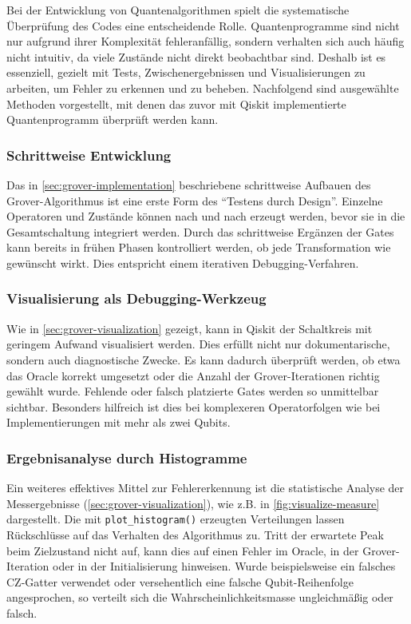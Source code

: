 Bei der Entwicklung von Quantenalgorithmen spielt die systematische Überprüfung des Codes eine entscheidende Rolle. Quantenprogramme sind nicht nur aufgrund ihrer Komplexität fehleranfällig, sondern verhalten sich auch häufig nicht intuitiv, da viele Zustände nicht direkt beobachtbar sind. Deshalb ist es essenziell, gezielt mit Tests, Zwischenergebnissen und Visualisierungen zu arbeiten, um Fehler zu erkennen und zu beheben. Nachfolgend sind ausgewählte Methoden vorgestellt, mit denen das zuvor mit Qiskit implementierte Quantenprogramm überprüft werden kann.

\subsubsection*{Schrittweise Entwicklung}
Das in \autoref{sec:grover-implementation} beschriebene schrittweise Aufbauen des Grover-Algorithmus ist eine erste Form des \enquote{Testens durch Design}. Einzelne Operatoren und Zustände können nach und nach erzeugt werden, bevor sie in die Gesamtschaltung integriert werden. Durch das schrittweise Ergänzen der Gates kann bereits in frühen Phasen kontrolliert werden, ob jede Transformation wie gewünscht wirkt. Dies entspricht einem iterativen Debugging-Verfahren.

\subsubsection*{Visualisierung als Debugging-Werkzeug}

Wie in \autoref{sec:grover-visualization} gezeigt, kann in Qiskit der Schaltkreis mit geringem Aufwand visualisiert werden. Dies erfüllt nicht nur dokumentarische, sondern auch diagnostische Zwecke. Es kann dadurch überprüft werden, ob etwa das Oracle korrekt umgesetzt oder die Anzahl der Grover-Iterationen richtig gewählt wurde. Fehlende oder falsch platzierte Gates werden so unmittelbar sichtbar. Besonders hilfreich ist dies bei komplexeren Operatorfolgen wie bei Implementierungen mit mehr als zwei Qubits.

\subsubsection*{Ergebnisanalyse durch Histogramme}

Ein weiteres effektives Mittel zur Fehlererkennung ist die statistische Analyse der Messergebnisse (\autoref{sec:grover-visualization}), wie z.B. in \autoref{fig:visualize-measure} dargestellt. Die mit \texttt{plot_histogram()} erzeugten Verteilungen lassen Rückschlüsse auf das Verhalten des Algorithmus zu. Tritt der erwartete Peak beim Zielzustand nicht auf, kann dies auf einen Fehler im Oracle, in der Grover-Iteration oder in der Initialisierung hinweisen. Wurde beispielsweise ein falsches CZ-Gatter verwendet oder versehentlich eine falsche Qubit-Reihenfolge angesprochen, so verteilt sich die Wahrscheinlichkeitsmasse ungleichmäßig oder falsch.

